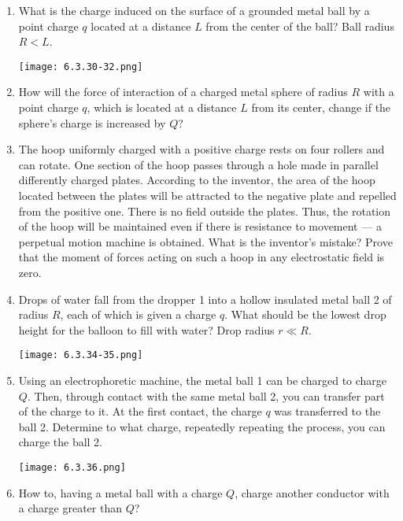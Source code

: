 \documentclass{article}
\begin{document}
\begin{enumerate}[label=6.3.\arabic*]
\item What is the charge induced on the surface of a grounded metal ball by a point charge $q$ located at a distance $L$ from the center of the ball? Ball radius $R < L$.

\begin{center}
    \texttt{[image: 6.3.30-32.png]}
\end{center}

\item How will the force of interaction of a charged metal sphere of radius $R$ with a point charge $q$, which is located at a distance $L$ from its center, change if the sphere's charge is increased by $Q$?

\item The hoop uniformly charged with a positive charge rests on four rollers and can rotate. One section of the hoop passes through a hole made in parallel differently charged plates. According to the inventor, the area of the hoop located between the plates will be attracted to the negative plate and repelled from the positive one. There is no field outside the plates. Thus, the rotation of the hoop will be maintained even if there is resistance to movement — a perpetual motion machine is obtained. What is the inventor's mistake? Prove that the moment of forces acting on such a hoop in any electrostatic field is zero.

\item Drops of water fall from the dropper 1 into a hollow insulated metal ball 2 of radius $R$, each of which is given a charge $q$. What should be the lowest drop height for the balloon to fill with water? Drop radius $r \ll R$.

\begin{center}
    \texttt{[image: 6.3.34-35.png]}
\end{center}

\item Using an electrophoretic machine, the metal ball 1 can be charged to charge $Q$. Then, through contact with the same metal ball 2, you can transfer part of the charge to it. At the first contact, the charge $q$ was transferred to the ball 2. Determine to what charge, repeatedly repeating the process, you can charge the ball 2.

\begin{center}
    \texttt{[image: 6.3.36.png]}
\end{center}

\item How to, having a metal ball with a charge $Q$, charge another conductor with a charge greater than $Q$?


\end{enumerate}
\end{document}
